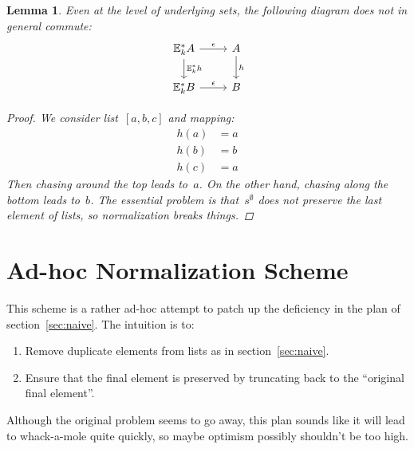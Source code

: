 \documentclass{article}
\theoremstyle{plain}
\newtheorem{lemma}[theorem]{Lemma}
\theoremstyle{definition}
\theoremstyle{remark}
\numberwithin{theorem}{section}
\begin{document}
\begin{lemma}
Even at the level of underlying sets, the following diagram does not in general commute:
\begin{equation*}
\begin{tikzcd}
\mathbb{E}^*_k A \ar[r, "\epsilon"] \ar[d, "\mathbb{E}^*_k h"] & A \ar[d, "h"]\\
\mathbb{E}^*_k B \ar[r, "\epsilon"] &  B
\end{tikzcd}
\end{equation*}
\begin{proof}
We consider list~$[a,b,c]$ and mapping:
\begin{align*}
    h(a) &= a\\
    h(b) &= b\\
    h(c) &= a
\end{align*}
Then chasing around the top leads to~$a$. On the other hand, chasing along the bottom leads to~$b$. The essential problem is that~$s^\emptyset$ does not preserve the last element of lists, so normalization breaks things.
\end{proof}

\end{lemma}

\section{Ad-hoc Normalization Scheme}
This scheme is a rather ad-hoc attempt to patch up the deficiency in the plan of section~\ref{sec:naive}. The intuition is to:
\begin{enumerate}
    \item Remove duplicate elements from lists as in section~\ref{sec:naive}.
    \item Ensure that the final element is preserved by truncating back to the ``original final element''.
\end{enumerate}
Although the original problem seems to go away, this plan sounds like it will lead to whack-a-mole quite quickly, so maybe optimism possibly shouldn't be too high.
\end{document}
